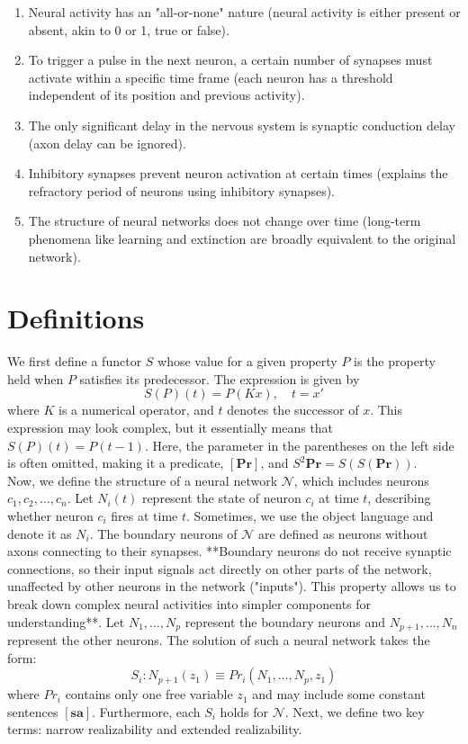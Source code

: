 \documentclass[11p,oneside]{book}
\begin{document}
\begin{enumerate}
    \item Neural activity has an "all-or-none" nature (neural activity is either present or absent, akin to 0 or 1, true or false).
    \item To trigger a pulse in the next neuron, a certain number of synapses must activate within a specific time frame (each neuron has a threshold independent of its position and previous activity).
    \item The only significant delay in the nervous system is synaptic conduction delay (axon delay can be ignored).
    \item Inhibitory synapses prevent neuron activation at certain times (explains the refractory period of neurons using inhibitory synapses).
    \item The structure of neural networks does not change over time (long-term phenomena like learning and extinction are broadly equivalent to the original network).
\end{enumerate}

\section*{Definitions}

We first define a functor $S$ whose value for a given property $P$ is the property held when $P$ satisfies its predecessor. The expression is given by
\[
S(P)(t) = P(Kx), \quad t = x'
\]
where $K$ is a numerical operator, and $t$ denotes the successor of $x$. This expression may look complex, but it essentially means that $S(P)(t) = P(t-1)$. Here, the parameter in the parentheses on the left side is often omitted, making it a predicate, $[\mathbf{Pr}]$, and $S^2 \mathbf{Pr} = S(S(\mathbf{Pr}))$.
\\

Now, we define the structure of a neural network $\mathcal{N}$, which includes neurons $c_1, c_2, \ldots, c_n$. Let $N_i(t)$ represent the state of neuron $c_i$ at time $t$, describing whether neuron $c_i$ fires at time $t$. Sometimes, we use the object language and denote it as $N_i$. The boundary neurons of $\mathcal{N}$ are defined as neurons without axons connecting to their synapses. **Boundary neurons do not receive synaptic connections, so their input signals act directly on other parts of the network, unaffected by other neurons in the network ("inputs"). This property allows us to break down complex neural activities into simpler components for understanding**. Let $N_1, \ldots, N_p$ represent the boundary neurons and $N_{p+1}, \ldots, N_n$ represent the other neurons. The solution of such a neural network takes the form:
\[
S_i: N_{p+1}(z_1) \equiv Pr_i(N_1, \ldots, N_p, z_1)
\]
where $Pr_i$ contains only one free variable $z_1$ and may include some constant sentences $[\mathbf{sa}]$. Furthermore, each $S_i$ holds for $\mathcal{N}$. Next, we define two key terms: narrow realizability and extended realizability.
\end{document}
